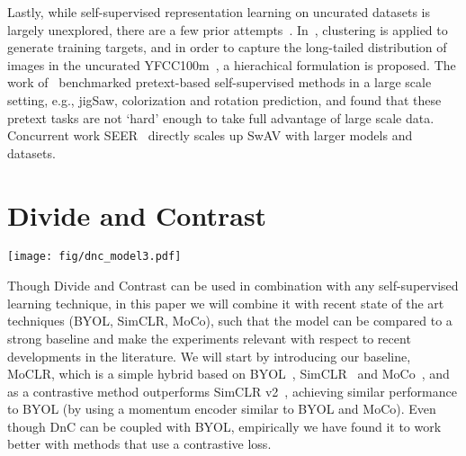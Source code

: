 \documentclass[final]{cvpr}
\newcommand\baseline{MoCLR}
\begin{document}
Lastly, while self-supervised representation learning on uncurated datasets is largely unexplored, there are a few prior attempts~\cite{caron2019unsupervised,goyal2019scaling}. In~\cite{caron2019unsupervised}, clustering is applied to generate training targets, and in order to capture the long-tailed distribution of images in the uncurated YFCC100m~\cite{thomee2016yfcc100m}, a hierachical formulation is proposed. The work of~\cite{goyal2019scaling} benchmarked pretext-based self-supervised methods in a large scale setting, e.g., jigSaw, colorization and rotation prediction, and found that these pretext tasks are not `hard' enough to take full advantage of large scale data. Concurrent work SEER~\cite{goyal2021self} directly scales up SwAV with larger models and datasets.


 \section{Divide and Contrast}

\begin{figure*}[t]
  \centering
  \texttt{[image: fig/dnc\_model3.pdf]}
  \caption{Overview of Divide and Contrast (DnC). DnC can be used in conjunction with any self-supervised learning method (we use \baseline{}, an improvement to SimCLR). In the first step a self-supervised learning method is trained on the whole dataset, which we call the base model. The image representations of the base model are then clustered with k-means into 5, 10 or more groups. In the second step, the clustered dataset is then used to train an expert model on each of the image clusters. In the third step the experts and base model are distilled into a single model by predicting their representations. By splitting the dataset into semantically-similar subsets, contrastive methods need to pay more attention to the differences between the images in those clusters and learn more specific representations.}\label{fig:dnc_model}
\end{figure*}

Though Divide and Contrast can be used in combination with any self-supervised learning technique, in this paper we will combine it with recent state of the art techniques (BYOL, SimCLR, MoCo), such that the model can be compared to a strong baseline and make the experiments relevant with respect to recent developments in the literature. We will start by introducing our baseline, \baseline{}, which is a simple hybrid based on BYOL~\cite{grill2020bootstrap}, SimCLR~\cite{chen2020simple} and MoCo~\cite{he2020momentum}, and as a contrastive method outperforms SimCLR v2~\cite{chen2020big}, achieving similar performance to BYOL (by using a momentum encoder similar to BYOL and MoCo). Even though DnC can be coupled with BYOL, empirically we have found it to work better with methods that use a contrastive loss.
\end{document}
